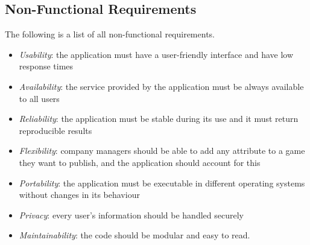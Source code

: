 \subsection{Non-Functional Requirements}
The following is a list of all non-functional requirements.
\begin{itemize}
	\item \emph{Usability}: the application must have a user-friendly interface and have low response times
	\item \emph{Availability}: the service provided by the application must be always available to all users
	\item \emph{Reliability}: the application must be stable during its use and it must return reproducible results
	\item \emph{Flexibility}: company managers should be able to add any attribute to a game they want to publish, and the application should account for this
	\item \emph{Portability}: the application must be executable in different operating systems without changes in its behaviour
	\item \emph{Privacy}: every user's information should be handled securely
	\item \emph{Maintainability}: the code should be modular and easy to read.
\end{itemize}
